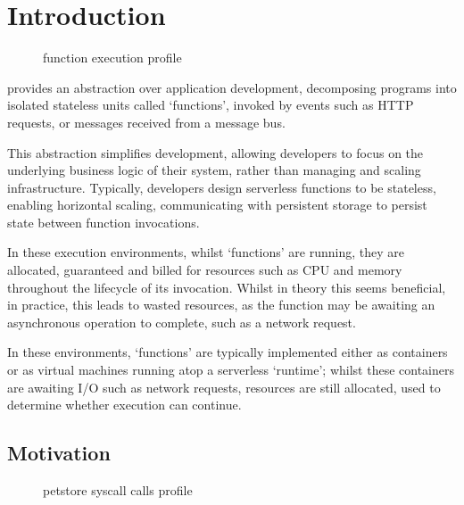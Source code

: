 \chapter{Introduction}

\begin{figure}
    \begin{center}
        
    \end{center}
    \caption{\faas{} function execution profile}
\end{figure}

\faasxlong{} provides an abstraction over application development, decomposing programs into isolated stateless units called `functions', invoked by events such as HTTP requests, or messages received from a message bus\cite{ibmWhatFaaSFunctionasaService2024}.

This abstraction simplifies development, allowing developers to focus on the underlying business logic of their system, rather than managing and scaling infrastructure. Typically, developers design serverless functions to be stateless\cite{ggailey777AzureFunctionsBest2022}, enabling horizontal scaling\cite{ngoEvaluatingScalabilityElasticity2022}, communicating with persistent storage to persist state between function invocations.

In these execution environments, whilst `functions' are running, they are allocated, guaranteed and billed for resources such as CPU and memory throughout the lifecycle of its invocation. Whilst in theory this seems beneficial, in practice, this leads to wasted resources, as the function may be awaiting an asynchronous operation to complete, such as a network request.

In these environments, `functions' are typically implemented either as containers or as virtual machines running atop a serverless `runtime'; whilst these containers are awaiting I/O such as network requests, resources are still allocated, used to determine whether execution can continue.

\section{Motivation}
\begin{figure}
    \begin{center}
        
    \end{center}
    \caption{\faas{} petstore syscall calls profile}
\end{figure}

